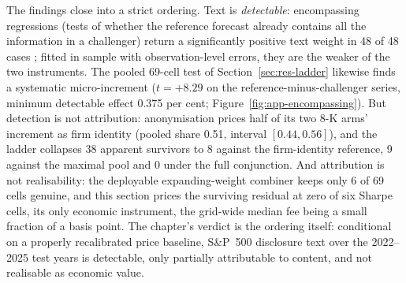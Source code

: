 The findings close into a strict ordering. Text is \emph{detectable}: encompassing regressions (tests of whether the reference forecast already contains all the information in a challenger) return a significantly positive text weight in 48 of 48 cases \cite{harvey1998encompassing}; fitted in sample with observation-level errors, they are the weaker of the two instruments. %
The pooled 69-cell test of Section~\ref{sec:res-ladder} likewise finds a systematic micro-increment ($t = +8.29$ on the reference-minus-challenger series, minimum detectable effect 0.375 per cent; Figure~\ref{fig:app-encompassing}). %
But detection is not attribution: anonymisation prices half of its two 8-K arms' increment as firm identity (pooled share 0.51, interval $[0.44, 0.56]$), %
and the ladder collapses 38 apparent survivors to 8 against the firm-identity reference, 9 against the maximal pool and 0 under the full conjunction. %
And attribution is not realisability: the deployable expanding-weight combiner keeps only 6 of 69 cells genuine, %
and this section prices the surviving residual at zero of six Sharpe cells, its only economic instrument, the grid-wide median fee being a small fraction of a basis point. %
The chapter's verdict is the ordering itself: conditional on a properly recalibrated price baseline, S\&P~500 disclosure text over the 2022--2025 test years is detectable, only partially attributable to content, and not realisable as economic value.
